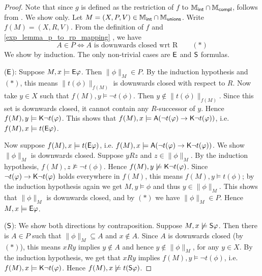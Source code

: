 \begin{proof}

    Note that since $g$ is defined as the restriction of $f$ to $\Mint \cap
    \Mcompl$,  follows from . We show
     only.
    Let $M = (X, P, V) \in \Mint \cap \Munions$. Write $f(M) =
    (X, R, V)$. From the definition of $f$ and
    \cref{exp_lemma_p_to_rp_mapping} , we have
    \[
        A \in P \iff A \text{ is downwards closed wrt R} \qquad(*)
    \]
    We show  by induction. The only non-trivial cases are
    $\E$ and $\S$ formulas.

        ($\E$): Suppose $M, x \models \E\phi$. Then $\|\phi\|_M \in P$. By
              the induction hypothesis and $(*)$, this means
              $\|t(\phi)\|_{f(M)}$ is downwards closed with respect to $R$. Now
              take $y \in X$ such that $f(M), y \models \neg t(\phi)$. Then $y
              \notin \|t(\phi)\|_{f(M)}$. Since this set is downwards closed,
              it cannot contain any $R$-successor of $y.$ Hence $f(M), y
              \models \K\neg t(\phi)$. This shows that $f(M), x \models \A(\neg
              t(\phi) \limplies \K\neg t(\phi))$, i.e. $f(M), x \models
              t(\E\phi)$.

              Now suppose $f(M), x \models t(\E\phi)$, i.e. $f(M), x \models
              \A(\neg t(\phi) \limplies \K\neg t(\phi))$. We show $\|\phi\|_M$
              is downwards closed. Suppose $yRz$ and $z \in \|\phi\|_M$. By the
              induction hypothesis, $f(M), z \not\models \neg t(\phi)$. Hence
              $f(M), y \not\models \K\neg t(\phi)$. Since $\neg t(\phi)
              \limplies \K\neg t(\phi)$ holds everywhere in $f(M)$, this means
              $f(M), y \models t(\phi)$; by the induction hypothesis again we
              get $M, y \models \phi$ and thus $y \in \|\phi\|_M$. This shows
              that $\|\phi\|_M$ is downwards closed, and by $(*)$ we have
              $\|\phi\|_M \in P$.  Hence $M, x \models \E\phi$.

        ($\S$): We show both directions by contraposition. Suppose $M, x
              \not\models \S\phi$. Then there is $A \in P$ such that
              $\|\phi\|_M \subseteq A$ and $x \notin A$. Since $A$ is downwards
              closed (by $(*)$), this means $xRy$ implies $y \notin A$ and
              hence $y \notin \|\phi\|_M$, for any $y \in X$. By the induction
              hypothesis, we get that $xRy$ implies $f(M), y \models \neg
              t(\phi)$, i.e.  $f(M), x \models \K\neg t(\phi)$. Hence $f(M), x
              \not\models t(\S\phi)$.


\end{proof}
